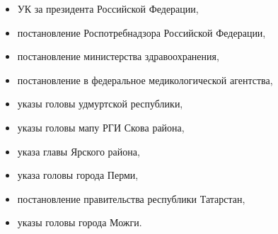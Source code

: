 \begin{itemize}
\begin{enumerate}
\begin{itemize}
			            \item УК за президента Российской Федерации,
			            \item постановление Роспотребнадзора Российской Федерации,
			            \item постановление министерства здравоохранения,
			            \item постановление в федеральное медикологической агентства,
			            \item указы головы удмуртской республики,
			            \item указы головы мапу РГИ Скова района,
			            \item указа главы Ярского района,
			            \item указа головы города Перми,
			            \item постановление правительства республики Татарстан,
			            \item указы головы города Можги.
		            \end{itemize}
	      \end{enumerate}
\end{itemize}
